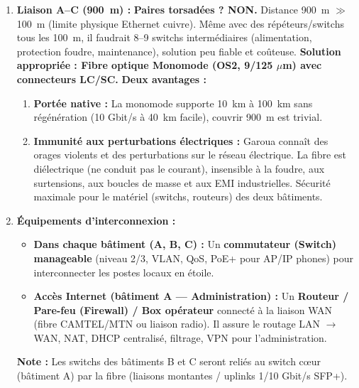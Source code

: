 \documentclass[11pt]{article}
\begin{document}
\begin{corrige}
\begin{enumerate}
  \item \textbf{Liaison A–C (\SI{900}{m}) :}
  \textbf{Paires torsadées ? NON.} Distance \SI{900}{m} $\gg$ \SI{100}{m} (limite physique Ethernet cuivre). Même avec des répéteurs/switchs tous les \SI{100}{m}, il faudrait 8--9 switchs intermédiaires (alimentation, protection foudre, maintenance), solution peu fiable et coûteuse.
  \textbf{Solution appropriée : Fibre optique Monomode (OS2, 9/125 $\mu$m) avec connecteurs LC/SC.}
  \textbf{Deux avantages :}
  \begin{enumerate}
    \item \textbf{Portée native :} La monomode supporte \SI{10}{km} à \SI{100}{km} sans régénération (10 Gbit/s à \SI{40}{km} facile), couvrir \SI{900}{m} est trivial.
    \item \textbf{Immunité aux perturbations électriques :} Garoua connaît des orages violents et des perturbations sur le réseau électrique. La fibre est diélectrique (ne conduit pas le courant), insensible à la foudre, aux surtensions, aux boucles de masse et aux EMI industrielles. Sécurité maximale pour le matériel (switchs, routeurs) des deux bâtiments.
  \end{enumerate}
  
  \item \textbf{Équipements d'interconnexion :}
  \begin{itemize}
    \item \textbf{Dans chaque bâtiment (A, B, C) :} Un \textbf{commutateur (Switch) manageable} (niveau 2/3, VLAN, QoS, PoE+ pour AP/IP phones) pour interconnecter les postes locaux en étoile.
    \item \textbf{Accès Internet (bâtiment A — Administration) :} Un \textbf{Routeur / Pare-feu (Firewall) / Box opérateur} connecté à la liaison WAN (fibre CAMTEL/MTN ou liaison radio). Il assure le routage LAN $\rightarrow$ WAN, NAT, DHCP centralisé, filtrage, VPN pour l'administration.
  \end{itemize}
  \textbf{Note :} Les switchs des bâtiments B et C seront reliés au switch cœur (bâtiment A) par la fibre (liaisons montantes / uplinks 1/10 Gbit/s SFP+).
  

\end{enumerate}
\end{corrige}
\end{document}

